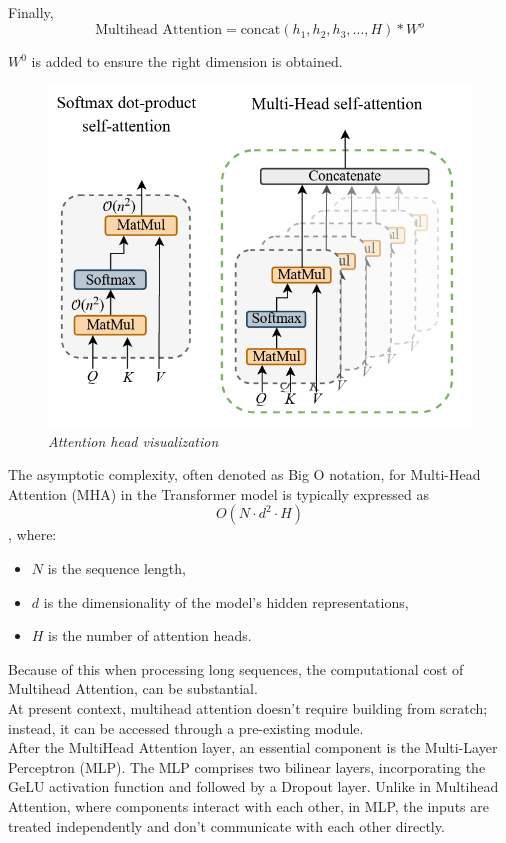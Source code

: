 Finally, \[\text{Multihead Attention} = \text{concat} (h_1, h_2, h_3,...,H)* W^o \]

$W^0$ is added to ensure the right dimension is obtained.


\begin{figure}[htbp]
    \centering
    \includegraphics[width=5in]{img/Attentionfig.png}
    \caption{\textit{Attention head visualization}}
\end{figure}

The asymptotic complexity, often denoted as Big O notation, for Multi-Head Attention (MHA) in the Transformer model is typically expressed as\[ O(N \cdot d^2 \cdot H)\], where:
\begin{itemize}
    \item $N$ is the sequence length,
    \item $d$ is the dimensionality of the model's hidden representations,
    \item $H$ is the number of attention heads.
\end{itemize}
Because of this when processing long sequences, the computational cost of Multihead Attention, can be substantial.\\

At present context, multihead attention doesn't require building from scratch; instead, it can be accessed through a pre-existing module.\\

After the MultiHead Attention layer, an essential component is the Multi-Layer Perceptron (MLP). The MLP comprises two bilinear layers, incorporating the GeLU activation function and followed by a Dropout layer. Unlike in Multihead Attention, where components interact with each other, in MLP, the inputs are treated independently and don't communicate with each other directly.\\

